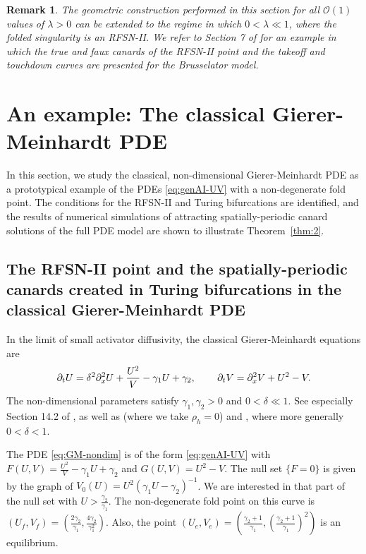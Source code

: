 \documentclass[11pt]{article}
\numberwithin{equation}{section}
\newtheorem{remark}{Remark}[section]
\begin{document}
\begin{remark}
    The geometric construction performed in this section for all $\mathcal{O}(1)$ values of $\lambda>0$ can be extended to the regime in which $0<\lambda\ll 1$, where the folded singularity is an RFSN-II.
    We refer to Section 7 of \cite{JDKV2026} for an example in which the true and faux canards of the RFSN-II point and the takeoff and touchdown curves are presented for the Brusselator model.
\end{remark}


\section{An example: The classical Gierer-Meinhardt PDE} \label{sec:GM-analysis}

In this section, we study the classical, non-dimensional Gierer-Meinhardt PDE as a prototypical example of the PDEs \eqref{eq:genAI-UV} with a non-degenerate fold point.
The conditions for the RFSN-II and Turing bifurcations are identified,
and the results of numerical simulations of attracting spatially-periodic canard solutions of the full PDE model are shown to illustrate Theorem~\ref{thm:2}.

\subsection{The RFSN-II point and the spatially-periodic canards created in Turing bifurcations in the classical Gierer-Meinhardt PDE}

In the limit of small activator diffusivity, the classical Gierer-Meinhardt equations are
\begin{equation}\label{eq:GM-nondim}
        \partial_t U = \delta^2 \partial_x^2 U + \frac{U^2}{V} - \gamma_1 U + \gamma_2, \hskip0.3truein
        \partial_t V = \partial_x^2 V + U^2 - V.
\end{equation}
%
The non-dimensional parameters satisfy $\gamma_1, \gamma_2 > 0$ and $0< \delta \ll 1$.
See especially Section 14.2 of \cite{M1989}, as well as \cite{GM-orig,Me1982} (where we take $\rho_h=0$) and \cite{EK2005,W1997}, where more generally $0<\delta < 1$.

The PDE \eqref{eq:GM-nondim} is of the form \eqref{eq:genAI-UV} with 
$F(U,V)= \frac{U^2}{V} -\gamma_1 U + \gamma_2$
and $G(U,V)=U^2 - V$.
The null set $\{ F=0 \}$ is given by the graph of $V_0(U) = U^2 (\gamma_1 U - \gamma_2)^{-1}$.
We are interested in that part of the null set with $U > \frac{\gamma_2}{\gamma_1}$.
The non-degenerate fold point on this curve is
$(U_f,V_f)=\left(\frac{2\gamma_2}{\gamma_1},\frac{4\gamma_2}{\gamma_1^2}\right)$.
Also, the point 
$(U_e,V_e)
=\left(\frac{\gamma_2 + 1}{\gamma_1},
\left( \frac{\gamma_2 + 1}{\gamma_1} \right)^2 \right)$ 
is an equilibrium.
\end{document}
